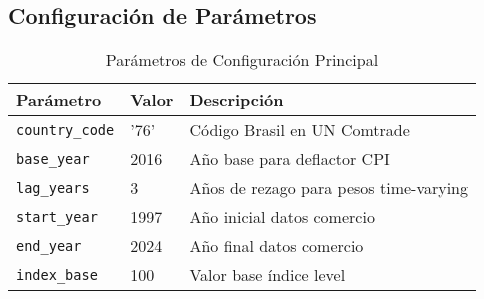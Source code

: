 \documentclass[12pt,a4paper]{article}
\begin{document}
\subsection{Configuración de Parámetros}

\begin{table}[H]
\centering
\caption{Parámetros de Configuración Principal}
\begin{tabular}{lll}
\toprule
\textbf{Parámetro} & \textbf{Valor} & \textbf{Descripción} \\
\midrule
\texttt{country\_code} & '76' & Código Brasil en UN Comtrade \\
\texttt{base\_year} & 2016 & Año base para deflactor CPI \\
\texttt{lag\_years} & 3 & Años de rezago para pesos time-varying \\
\texttt{start\_year} & 1997 & Año inicial datos comercio \\
\texttt{end\_year} & 2024 & Año final datos comercio \\
\texttt{index\_base} & 100 & Valor base índice level \\
\bottomrule
\end{tabular}
\label{tab:config_params}
\end{table}
\end{document}
